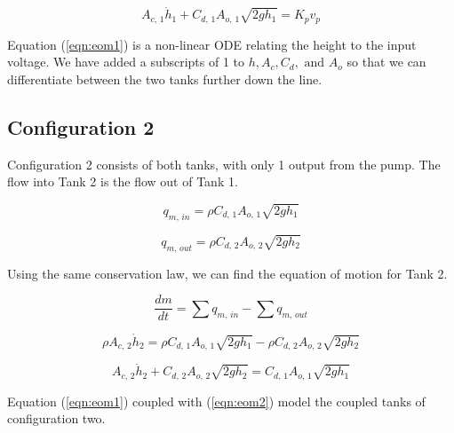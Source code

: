 \documentclass[12pt]{article}
\numberwithin{equation}{subsection}
\begin{document}
  \begin{equation} \label{eqn:eom1}
    A_{c, \, 1} \dot h_1 +  C_{d, \, 1} A_{o, \, 1} \sqrt{2gh_1} = K_p v_p
  \end{equation}

  Equation (\ref{eqn:eom1}) is a non-linear ODE relating the height to the input voltage. We have added a subscripts of 1 to $ h, A_c, C_d, \text{ and } A_o $ so that we can differentiate between the two tanks further down the line.

  \subsection{Configuration 2}

  Configuration 2 consists of both tanks, with only 1 output from the pump. The flow into Tank 2 is the flow out of Tank 1.

  \begin{equation}
    q_{m, \, in} = \rho C_{d, \, 1} A_{o, \, 1}  \sqrt{2gh_1}
  \end{equation}

  \begin{equation}
    q_{m, \, out} = \rho C_{d, \, 2} A_{o, \, 2}  \sqrt{2gh_2}
  \end{equation}

  Using the same conservation law, we can find the equation of motion for Tank 2.

  \begin{equation}
    \frac{dm}{dt} = \sum q_{m, \, in} - \sum q_{m ,\, out}
  \end{equation}

  \begin{equation}
    \rho A_{c, \, 2} \dot h_2 = \rho C_{d, \, 1} A_{o, \, 1}  \sqrt{2gh_1} - \rho C_{d, \, 2} A_{o, \, 2}  \sqrt{2gh_2}
  \end{equation}

  \begin{equation} \label{eqn:eom2}
    A_{c, \, 2} \dot h_2 + C_{d, \, 2} A_{o, \, 2}  \sqrt{2gh_2} = C_{d, \, 1} A_{o, \, 1}  \sqrt{2gh_1}
  \end{equation}

  Equation (\ref{eqn:eom1}) coupled with (\ref{eqn:eom2}) model the coupled tanks of configuration two.
\end{document}
